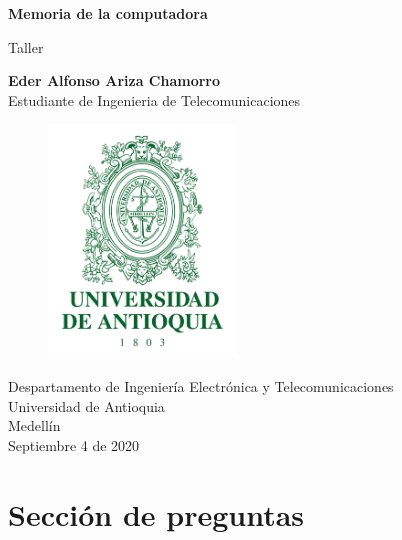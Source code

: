 \documentclass{article}
\begin{document}
	
	\begin{titlepage}
		
		\begin{center}
			
			\vspace*{1cm}
			
			\Huge
			\textbf{Memoria de la computadora}
			
			\vspace{0.5cm}
			
			\LARGE
			Taller
			
			\vspace{0.5cm}
			
			\LARGE
			\textbf{Eder Alfonso Ariza Chamorro}\\
			Estudiante de Ingenieria de Telecomunicaciones\\
			
			\vspace*{1.5cm}
			
			\begin{figure}[h]
				\includegraphics[width=5cm]{Logo UdeA.png}
				\centering
				\label{fig:Logo UdeA}
			\end{figure}
			
			\vspace*{2cm}
			
			\Large
			Despartamento de Ingeniería Electrónica y Telecomunicaciones\\
			Universidad de Antioquia\\
			Medellín\\
			Septiembre 4 de 2020
			
		\end{center}
		
	\end{titlepage}
	
	
	\tableofcontents
	\newpage
	\section{Sección de preguntas}\label{contenido}
	
\end{document}
